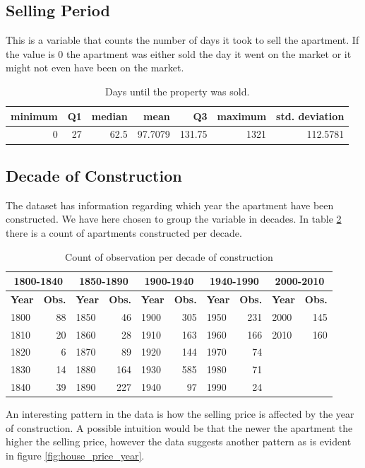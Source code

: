 \subsection*{Selling Period}
This is a variable that counts the number of days it took to sell the apartment.
If the value is 0 the apartment was either sold the day it went on the market or it might not even have been on the market.
\begin{table}[H]
    \centering
    \begin{tabular}{rrrrrrr}
        \toprule
        \textbf{minimum} & \textbf{Q1} & \textbf{median} & \textbf{mean} & \textbf{Q3} & \textbf{maximum} & \textbf{std. deviation}\\
        \midrule
        0 & 27 & 62.5 & 97.7079 & 131.75 & 1321 & 112.5781\\
        \bottomrule
    \end{tabular}
    \caption{Days until the property was sold.}
    \label{tbl:days_until_sold}
\end{table}

\subsection*{Decade of Construction}
The dataset has information regarding which year the apartment have been constructed.
We have here chosen to group the variable in decades.
In table \ref{tbl:year_of_constuction} there is a count of apartments constructed per decade.
\begin{table}[H]
    \centering
    \begin{tabular}{lr|lr|lr|lr|lr}
        \toprule [1.5pt]
        \multicolumn{2}{c}{\textbf{1800-1840}} & 
        \multicolumn{2}{c}{\textbf{1850-1890}} & 
        \multicolumn{2}{c}{\textbf{1900-1940}} & 
        \multicolumn{2}{c}{\textbf{1940-1990}} & 
        \multicolumn{2}{c}{\textbf{2000-2010}} \\[2pt]
        \toprule[1.5pt]
        \textbf{Year} & \textbf{Obs.} & 
        \textbf{Year} & \textbf{Obs.} & 
        \textbf{Year} & \textbf{Obs.} & 
        \textbf{Year} & \textbf{Obs.} & 
        \textbf{Year} & \textbf{Obs.} \\
        \midrule
        1800 & 88 & 1850 & 46  & 1900 & 305 & 1950 & 231 & 2000 & 145 \\
        1810 & 20 & 1860 & 28  & 1910 & 163 & 1960 & 166 & 2010 & 160 \\
        1820 & 6  & 1870 & 89  & 1920 & 144 & 1970 & 74  \\
        1830 & 14 & 1880 & 164 & 1930 & 585 & 1980 & 71  \\
        1840 & 39 & 1890 & 227 & 1940 & 97  & 1990 & 24  \\
        \bottomrule
    \end{tabular}
    \caption{Count of observation per decade of construction}
    \label{tbl:year_of_constuction}
\end{table}
An interesting pattern in the data is how the selling price is affected by the year of construction.
A possible intuition would be that the newer the apartment the higher the selling price, however the data suggests another pattern as is evident in figure \ref{fig:house_price_year}.

